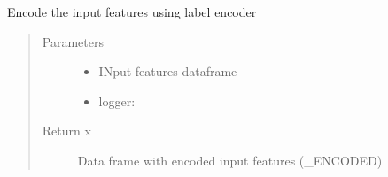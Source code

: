 \documentclass[letterpaper,10pt,english]{sphinxmanual}
\begin{document}

\begin{fulllineitems}
\label{\detokenize{index:dummy_project_utils.enconde_input_features}}
\sphinxAtStartPar
{}
Encode the input features using label encoder
\begin{quote}\begin{description}
\item[{Parameters}] \leavevmode\begin{itemize}
\item {} 
\sphinxAtStartPar
{} \textendash{} INput features dataframe

\item {} 
\sphinxAtStartPar
{} \textendash{} logger:

\end{itemize}

\item[{Return x}] \leavevmode
\sphinxAtStartPar
Data frame with encoded input features (\_ENCODED)

\end{description}\end{quote}

\end{fulllineitems}

\end{document}
